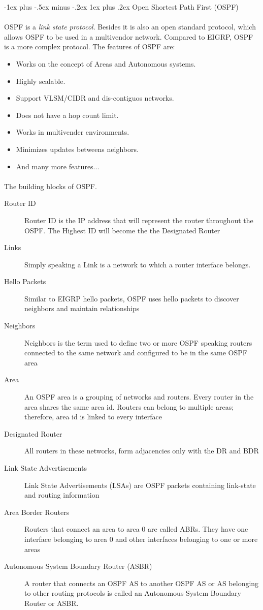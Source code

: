 \documentclass[10pt,landscape]{article}
\makeatletter
\renewcommand{\subsubsection}{\@startsection{subsubsection}{3}{0mm}%
                                {-1ex plus -.5ex minus -.2ex}%
                                {1ex plus .2ex}%
                                {\normalfont\small\bfseries}}
\makeatother
\begin{document}
\begin{multicols}{3}
\subsubsection{Open Shortest Path First (OSPF)}
\paragraph{}
OSPF is a \textit{link state protocol}. Besides it is also an open standard protocol, which allows OSPF to be used in a multivendor network.
Compared to EIGRP, OSPF is a more complex protocol. The features of OSPF are:
\begin{itemize}
	\item Works on the concept of Areas and Autonomous systems.
	\item Highly scalable.
	\item Support VLSM/CIDR and dis-contiguos networks.
	\item Does not have a hop count limit.
	\item Works in multivender environments.
	\item Minimizes updates betweens neighbors.
	\item And many more features...
\end{itemize}
\paragraph{}
The building blocks of OSPF.
\begin{description}
	\item[Router ID] Router ID is the IP address that will represent the router throughout the OSPF. The Highest ID will become the the Designated Router
	\item[Links] Simply speaking a Link is a network to which a router interface belongs.
	\item[Hello Packets] Similar to EIGRP hello packets, OSPF uses hello packets to discover neighbors and maintain relationships 
	\item[Neighbors]  Neighbors is the term used to define two or more OSPF speaking routers connected to the same network and configured to be in the same OSPF area
	\item[Area] An OSPF area is a grouping of networks and routers. Every router in the area shares the same area id. Routers can belong to multiple areas; therefore, area id is linked to every interface
	\item[Designated Router] All routers in these networks, form adjacencies only with the DR and BDR
	\item[Link State Advertisements] Link State Advertisements (LSAs) are OSPF packets containing link-state and routing information
	\item[Area Border Routers] Routers that connect an area to area 0 are called ABRs. They have one interface belonging to area 0 and other interfaces belonging to one or more areas
	\item[Autonomous System Boundary Router (ASBR)] A router that connects an OSPF AS to another OSPF AS or AS belonging to other routing protocols is called an Autonomous System Boundary Router or ASBR.
\end{description}

\end{multicols}
\end{document}
